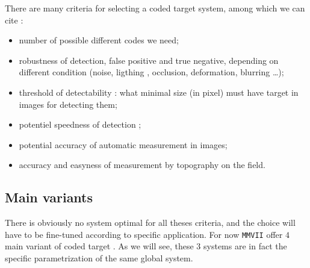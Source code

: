 There are many criteria for selecting a coded target system, among which we can cite :

\begin{itemize}
    \item number of possible different codes we need;

    \item robustness of detection, false positive and true negative,  depending on
	    different condition  (noise, ligthing , occlusion,  deformation, blurring \dots);

    \item threshold of detectability : what minimal size (in pixel) must have target in images
	    for detecting them;

    \item potentiel speedness of detection ;

    \item potential accuracy of automatic measurement in images;

    \item accuracy and easyness of measurement by topography on the field.

\end{itemize}



\subsection{Main variants}

There is obviously no system optimal for all theses criteria, and the choice will have to
be fine-tuned according to specific application.
For now {\tt MMVII} offer $4$ main variant of coded target . As we will see, these $3$ systems are in
fact the specific parametrization of the same global system.

